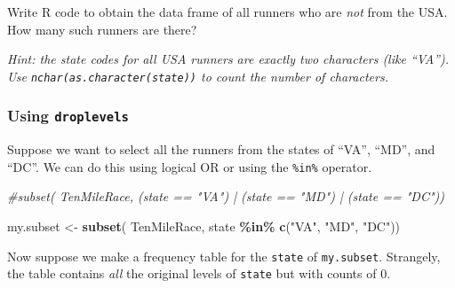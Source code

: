 \documentclass[
]{article}
\newenvironment{Shaded}{\begin{snugshade}}{\end{snugshade}}
\newcommand{\CommentTok}[1]{\textcolor[rgb]{0.56,0.35,0.01}{\textit{#1}}}
\newcommand{\FunctionTok}[1]{\textcolor[rgb]{0.13,0.29,0.53}{\textbf{#1}}}
\newcommand{\NormalTok}[1]{#1}
\newcommand{\OtherTok}[1]{\textcolor[rgb]{0.56,0.35,0.01}{#1}}
\newcommand{\SpecialCharTok}[1]{\textcolor[rgb]{0.81,0.36,0.00}{\textbf{#1}}}
\newcommand{\StringTok}[1]{\textcolor[rgb]{0.31,0.60,0.02}{#1}}
\begin{document}
Write R code to obtain the data frame of all runners who are \emph{not}
from the USA. How many such runners are there?

\emph{Hint: the state codes for all USA runners are exactly two
characters (like ``VA''). Use \texttt{nchar(as.character(state))} to
count the number of characters.}

\subsubsection{\texorpdfstring{Using
\texttt{droplevels}}{Using droplevels}}\label{using-droplevels}

Suppose we want to select all the runners from the states of ``VA'',
``MD'', and ``DC''. We can do this using logical OR or using the
\texttt{\%in\%} operator.

\begin{Shaded}
\begin{Highlighting}[]
\CommentTok{\#subset( TenMileRace, (state == "VA") | (state == "MD") | (state == "DC"))}
\end{Highlighting}
\end{Shaded}

\begin{Shaded}
\begin{Highlighting}[]
\NormalTok{my.subset }\OtherTok{\textless{}{-}} \FunctionTok{subset}\NormalTok{( TenMileRace, state }\SpecialCharTok{\%in\%} \FunctionTok{c}\NormalTok{(}\StringTok{"VA"}\NormalTok{, }\StringTok{"MD"}\NormalTok{, }\StringTok{"DC"}\NormalTok{))}
\end{Highlighting}
\end{Shaded}

Now suppose we make a frequency table for the \texttt{state} of
\texttt{my.subset}. Strangely, the table contains \emph{all} the
original levels of \texttt{state} but with counts of 0.

\begin{Shaded}
\end{Shaded}
\end{document}
